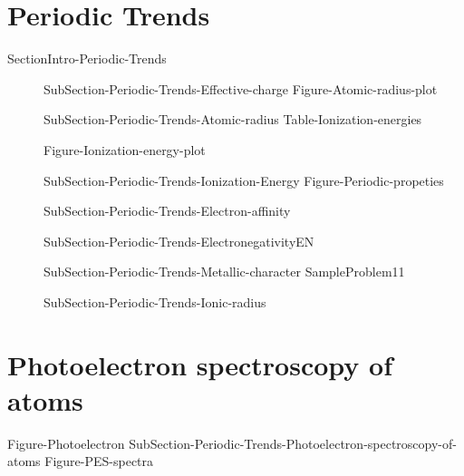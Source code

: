 \documentclass[main.tex]{subfiles}
\newcommand\chapterlabel{Ch-radiation}\setcounter{figurenewcounter}{0}\setcounter{tablenewcounter}{0}\setcounter{formulanewcounter}{0}\chapterpicture{../{\chapterlabel}/figure1}\chapterpicturelabel{PngImg}
\begin{document}
\section{Periodic Trends}{SectionIntro-Periodic-Trends}
\vspace{0cm}{Figure-Atomic-radius}

\sloppy\begin{description}
\item[] {SubSection-Periodic-Trends-Effective-charge}
{Figure-Atomic-radius-plot}
\item[] {SubSection-Periodic-Trends-Atomic-radius}
{Table-Ionization-energies}

{Figure-Ionization-energy-plot}
\item[] {SubSection-Periodic-Trends-Ionization-Energy}
{Figure-Periodic-propeties}
\item[] {SubSection-Periodic-Trends-Electron-affinity}
\item[] {SubSection-Periodic-Trends-ElectronegativityEN}
\item[]{SubSection-Periodic-Trends-Metallic-character}
{SampleProblem11}
\item[]  {SubSection-Periodic-Trends-Ionic-radius}
\end{description}


\section{Photoelectron spectroscopy of atoms}
{Figure-Photoelectron}%
{SubSection-Periodic-Trends-Photoelectron-spectroscopy-of-atoms}%
{Figure-PES-spectra}%
\newpage
\end{document}
